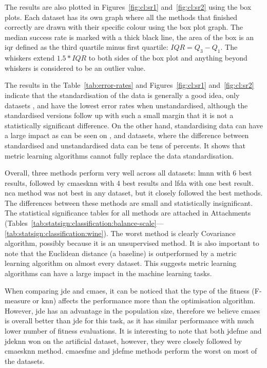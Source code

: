 \documentclass[12pt,a4paper]{report}
\begin{document}


The results are also plotted in Figures~\ref{fig:cl:sr1} and~\ref{fig:cl:sr2} using the box plots. Each dataset has its own graph where all the methods that finished correctly are drawn with their specific colour using the box plot graph. The median success rate is marked with a thick black line, the area of the box is an \ac{iqr} defined as the third quartile minus first quartile: $IQR = Q_3 - Q_1$. The whiskers extend $1.5*IQR$ to both sides of the box plot and anything beyond whiskers is considered to be an outlier value.

The results in the Table~\ref{tab:error-rates} and Figures~\ref{fig:cl:sr1} and~\ref{fig:cl:sr2} indicate that the standardisation of the data is generally a good idea, only datasets ,  and  have the lowest error rates when unstandardised, although the standardised versions follow up with such a small margin that it is not a statistically significant difference. On the other hand, standardising data can have a large impact as can be seen on ,  and  datasets, where the difference between standardised and unstandardised data can be tens of percents. It shows that metric learning algorithms cannot fully replace the data standardisation.

Overall, three methods perform very well across all datasets: \ac{lmnn} with 6 best results, followed by \ac{cmaesknn} with 4 best results and \ac{lfda} with one best result. \ac{nca} method was not best in any dataset, but it closely followed the best methods. The differences between these methods are small and statistically insignificant. The statistical significance tables for all methods are attached in Attachments (Tables~\ref{tab:statsign:classification:balance-scale}---\ref{tab:statsign:classification:wine}). The worst method is clearly Covariance algorithm, possibly because it is an unsupervised method. It is also important to note that the Euclidean distance (a baseline) is outperformed by a metric learning algorithm on almost every dataset. This suggests metric learning algorithms can have a large impact in the machine learning tasks.

When comparing \ac{jde} and \ac{cmaes}, it can be noticed that the type of the fitness (\mbox{F-measure} or \ac{knn}) affects the performance more than the optimisation algorithm. However, \ac{jde} has an advantage in the population size, therefore we believe \ac{cmaes} is overall better than \ac{jde} for this task, as it has similar performance with much lower number of fitness evaluations. It is interesting to note that both \ac{jdefme} and \ac{jdeknn} won on the artificial  dataset, however, they were closely followed by \ac{cmaesknn} method. \ac{cmaesfme} and \ac{jdefme} methods perform the worst on most of the datasets.
\end{document}

